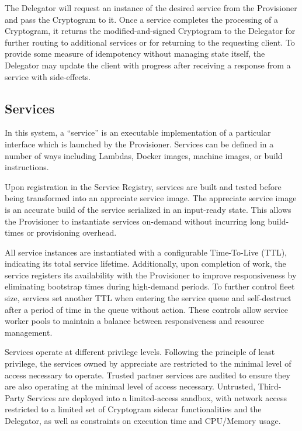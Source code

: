 \documentclass[a4paper,onecolumn, 10.5pt]{article}
\begin{document}
The Delegator will request an instance of the desired service from the Provisioner and pass the Cryptogram to it. Once a service completes the processing of a Cryptogram, it returns the modified-and-signed Cryptogram to the Delegator for further routing to additional services or for returning to the requesting client. To provide some measure of idempotency without managing state itself, the Delegator may update the client with progress after receiving a response from a service with side-effects.


\subsection{Services}
In this system, a “service” is an executable implementation of a particular interface which is launched by the Provisioner. Services can be defined in a number of ways including Lambdas, Docker images, machine images, or build instructions.

Upon registration in the Service Registry, services are built and tested before being transformed into an appreciate service image. The appreciate service image is an accurate build of the service serialized in an input-ready state. This allows the Provisioner to instantiate services on-demand without incurring long build-times or provisioning overhead.

All service instances are instantiated with a configurable Time-To-Live (TTL), indicating its total service lifetime. Additionally, upon completion of work, the service registers its availability with the Provisioner to improve responsiveness by eliminating bootstrap times during high-demand periods. To further control fleet size, services set another TTL when entering the service queue and self-destruct after a period of time in the queue without action. These controls allow service worker pools to maintain a balance between responsiveness and resource management.

Services operate at different privilege levels. Following the principle of least privilege, the services owned by appreciate are restricted to the minimal level of access necessary to operate. Trusted partner services are audited to ensure they are also operating at the minimal level of access necessary. Untrusted, Third-Party Services are deployed into a limited-access sandbox, with network access restricted to a limited set of Cryptogram sidecar functionalities and the Delegator, as well as constraints on execution time and CPU/Memory usage.
\end{document}
